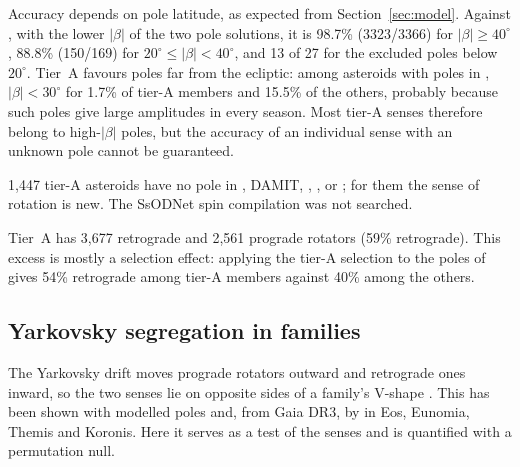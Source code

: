 Accuracy depends on pole latitude, as expected from Section~\ref{sec:model}. Against \citet{Durech2023},
with the lower $|\beta|$ of the two pole solutions, it is 98.7\% (3323/3366) for $|\beta|\ge40^\circ$, 88.8\%
(150/169) for $20^\circ\le|\beta|<40^\circ$, and 13 of 27 for the excluded poles below $20^\circ$. Tier~A favours poles far from the ecliptic: among asteroids with poles in \citet{Durech2023},
$|\beta|<30^\circ$ for 1.7\% of tier-A members and 15.5\% of the others, probably because such poles give
large amplitudes in every season. Most tier-A senses therefore belong to high-$|\beta|$ poles, but the
accuracy of an individual sense with an unknown pole cannot be guaranteed.

1{,}447 tier-A asteroids have no pole in \citet{Durech2023}, DAMIT, \citet{Cellino2024}, \citet{MacLennan2026},
\citet{Durech2020} or \citet{Durech2016}; for them the sense of rotation is new. The SsODNet spin compilation
was not searched.

Tier~A has 3{,}677 retrograde and 2{,}561 prograde rotators (59\% retrograde). This excess is mostly a
selection effect: applying the tier-A selection to the poles of \citet{Durech2023} gives 54\% retrograde
among tier-A members against 40\% among the others.

\subsection{Yarkovsky segregation in families}

The Yarkovsky drift moves prograde rotators outward and retrograde ones inward, so the two senses lie on
opposite sides of a family's V-shape \citep{Vokrouhlicky2015}. This has been shown with modelled poles
\citep{Hanus2013,Hanus2018,Kryszczynska2013} and, from Gaia DR3, by \citet{Durech2023} in Eos, Eunomia,
Themis and Koronis. Here it serves as a test of the senses and is quantified with a permutation null.

